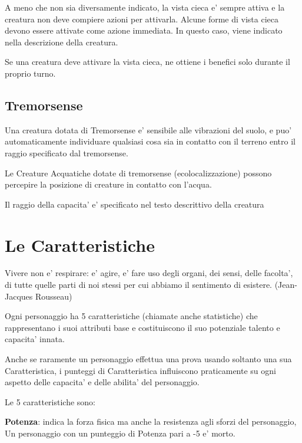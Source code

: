 \documentclass[a4paper,11pt,twoside,openany]{dndbook}
\begin{document}
A meno che non sia diversamente indicato, la vista cieca e' sempre attiva e la creatura non deve compiere azioni per attivarla. Alcune forme di vista cieca devono essere attivate come azione immediata. In questo caso, viene indicato nella descrizione della creatura.

Se una creatura deve attivare la vista cieca, ne ottiene i benefici solo durante il proprio turno.

\subsection{Tremorsense}
Una creatura dotata di Tremorsense e' sensibile alle vibrazioni del suolo, e puo' automaticamente individuare qualsiasi cosa sia in contatto con il terreno entro il raggio specificato dal tremorsense.

Le Creature Acquatiche dotate di tremorsense (ecolocalizzazione) possono percepire la posizione di creature in contatto con l’acqua.

Il raggio della capacita' e' specificato nel testo descrittivo della creatura

\pagebreak

\section{Le Caratteristiche}

\label{le-caratteristiche}

\begin{quotebox}Vivere non e' respirare: e' agire, e' fare uso degli organi, dei sensi, delle facolta', di tutte quelle parti di noi stessi per cui abbiamo il sentimento di esistere. (Jean-Jacques Rousseau)
\end{quotebox}


Ogni personaggio ha 5 caratteristiche (chiamate anche statistiche) che rappresentano i suoi attributi base e costituiscono il suo potenziale talento e capacita' innata. 

Anche se raramente un personaggio effettua una prova usando soltanto una sua Caratteristica, i punteggi di Caratteristica influiscono praticamente su ogni aspetto delle capacita' e delle abilita' del personaggio.

Le 5 caratteristiche sono:

\textbf{Potenza}: indica la forza fisica ma anche la resistenza agli sforzi del personaggio, Un personaggio con un punteggio di Potenza pari a -5 e' morto.
\end{document}
